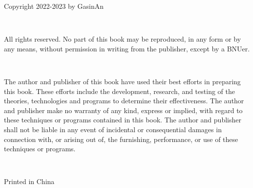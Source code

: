 \thispagestyle{empty}

\noindent Copyright \textcopyright{} 2022-2023 by GasinAn

\ 

\noindent All rights reserved. No part of this book may be reproduced, in any form or by any means, without permission in writing from the publisher, except by a BNUer.

\ 

\noindent The author and publisher of this book have used their best efforts in preparing this book. These efforts include the development, research, and testing of the theories, technologies and programs to determine their effectiveness. The author and publisher make no warranty of any kind, express or implied, with regard to these techniques or programs contained in this book. The author and publisher shall not be liable in any event of incidental or consequential damages in connection with, or arising out of, the furnishing, performance, or use of these techniques or programs.

\ 

\noindent Printed in China
